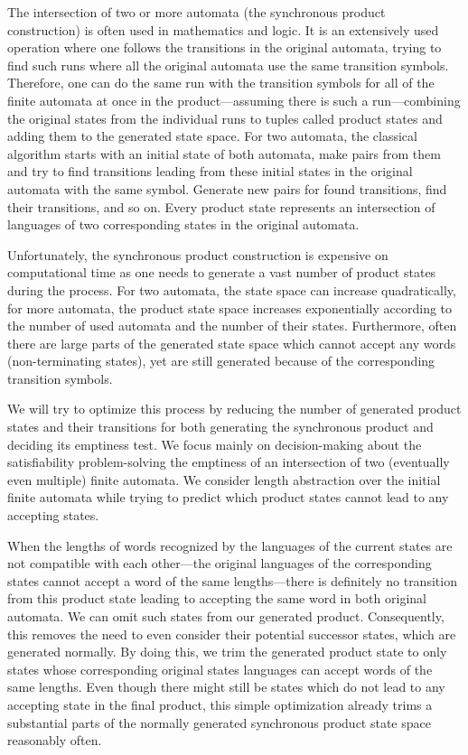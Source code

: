 
The intersection of two or more automata (the synchronous product construction) is often used in mathematics and logic. It is an extensively used operation where one follows the transitions in the original automata, trying to find such runs where all the original automata use the same transition symbols. Therefore, one can do the same run with the transition symbols for all of the finite automata at once in the product---assuming there is such a run---combining the original states from the individual runs to tuples called product states and adding them to the generated state space. For two automata, the classical algorithm starts with an initial state of both automata, make pairs from them and try to find transitions leading from these initial states in the original automata with the same symbol. Generate new pairs for found transitions, find their transitions, and so on. Every product state represents an intersection of languages of two corresponding states in the original automata.

Unfortunately, the synchronous product construction is expensive on computational time as one needs to generate a vast number of product states during the process. For two automata, the state space can increase quadratically, for more automata, the product state space increases exponentially according to the number of used automata and the number of their states. Furthermore, often there are large parts of the generated state space which cannot accept any words (non-terminating states), yet are still generated because of the corresponding transition symbols.


We will try to optimize this process by reducing the number of generated product states and their transitions for both generating the synchronous product and deciding its emptiness test. We focus mainly on decision-making about the satisfiability problem-solving the emptiness of an intersection of two (eventually even multiple) finite automata. We consider length abstraction over the initial finite automata while trying to predict which product states cannot lead to any accepting states.

When the lengths of words recognized by the languages of the current states are not compatible with each other---the original languages of the corresponding states cannot accept a word of the same lengths---there is definitely no transition from this product state leading to accepting the same word in both original automata. We can omit such states from our generated product. Consequently, this removes the need to even consider their potential successor states, which are generated normally. By doing this, we trim the generated product state to only states whose corresponding original states languages can accept words of the same lengths. Even though there might still be states which do not lead to any accepting state in the final product, this simple optimization already trims a substantial parts of the normally generated synchronous product state space reasonably often.

